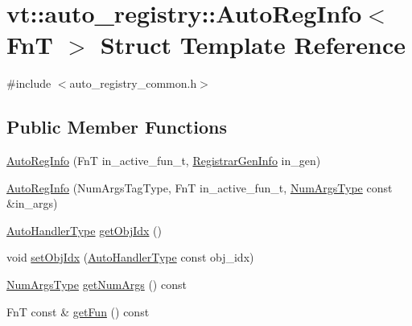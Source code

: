 \hypertarget{structvt_1_1auto__registry_1_1_auto_reg_info}{}\section{vt\+:\+:auto\+\_\+registry\+:\+:Auto\+Reg\+Info$<$ FnT $>$ Struct Template Reference}
\label{structvt_1_1auto__registry_1_1_auto_reg_info}


{\ttfamily \#include $<$auto\+\_\+registry\+\_\+common.\+h$>$}

\subsection*{Public Member Functions}
\begin{DoxyCompactItemize}
\item 
\hyperlink{structvt_1_1auto__registry_1_1_auto_reg_info_a5ba88723b47b540f23a5738e750fd70a}{Auto\+Reg\+Info} (FnT in\+\_\+active\+\_\+fun\+\_\+t, \hyperlink{structvt_1_1auto__registry_1_1_registrar_gen_info}{Registrar\+Gen\+Info} in\+\_\+gen)
\item 
\hyperlink{structvt_1_1auto__registry_1_1_auto_reg_info_a27b04381553c1a745ababc3120eb6dde}{Auto\+Reg\+Info} (Num\+Args\+Tag\+Type, FnT in\+\_\+active\+\_\+fun\+\_\+t, \hyperlink{namespacevt_1_1auto__registry_aebda1d9d765bc9147dc654ad0712c936}{Num\+Args\+Type} const \&in\+\_\+args)
\item 
\hyperlink{namespacevt_1_1auto__registry_ae295e18699146815bb7d7674594d95d7}{Auto\+Handler\+Type} \hyperlink{structvt_1_1auto__registry_1_1_auto_reg_info_a3dabecf4e0f40b05cc8f6657e9232b71}{get\+Obj\+Idx} ()
\item 
void \hyperlink{structvt_1_1auto__registry_1_1_auto_reg_info_a620c9ece26186f0ac64901d74538c333}{set\+Obj\+Idx} (\hyperlink{namespacevt_1_1auto__registry_ae295e18699146815bb7d7674594d95d7}{Auto\+Handler\+Type} const obj\+\_\+idx)
\item 
\hyperlink{namespacevt_1_1auto__registry_aebda1d9d765bc9147dc654ad0712c936}{Num\+Args\+Type} \hyperlink{structvt_1_1auto__registry_1_1_auto_reg_info_abf206854a022455be3f70a18d261671d}{get\+Num\+Args} () const
\item 
FnT const  \& \hyperlink{structvt_1_1auto__registry_1_1_auto_reg_info_a04bc8afbcaa80c63573e96507b60f364}{get\+Fun} () const
\end{DoxyCompactItemize}
